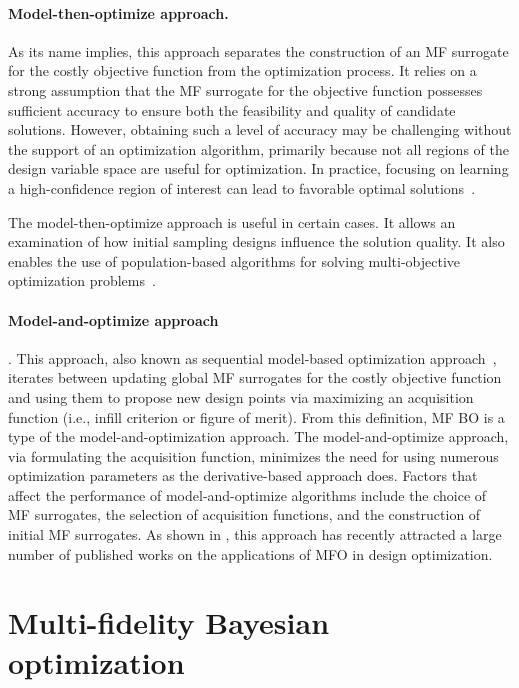 \documentclass[iicol,sn-basic]{sn-jnl}%
\begin{document}
\paragraph{Model-then-optimize approach.}
As its name implies, this approach separates the construction of an MF surrogate for the costly objective function from the optimization process.
It relies on a strong assumption that the MF surrogate for the objective function possesses sufficient accuracy to ensure both the feasibility and quality of candidate solutions.
However, obtaining such a level of accuracy may be challenging without the support of an optimization algorithm, primarily because not all regions of the design variable space are useful for optimization.
In practice, focusing on learning a high-confidence region of interest can lead to favorable optimal solutions~\citep{ZhangF2023}.
 
The model-then-optimize approach is useful in certain cases.
It allows an examination of how initial sampling designs influence the solution quality.
It also enables the use of population-based algorithms for solving multi-objective optimization problems~\citep{Viana2009,Leusink2015,Singh2017,Yang2018}.

\paragraph{Model-and-optimize approach}.
This approach, also known as sequential model-based optimization approach~\citep{Bossek2020}, iterates between updating global MF surrogates for the costly objective function and using them to propose new design points via maximizing an acquisition function (i.e., infill criterion or figure of merit).
From this definition, MF BO is a type of the model-and-optimization approach. 
The model-and-optimize approach, via formulating the acquisition function, minimizes the need for using numerous optimization parameters as the derivative-based approach does.
Factors that affect the performance of model-and-optimize algorithms include the choice of MF surrogates, the selection of acquisition functions, and the construction of initial MF surrogates.
As shown in , this approach has recently attracted a large number of published works on the applications of MFO in design optimization.

\section{Multi-fidelity Bayesian optimization}\label{Sec3}
\end{document}
